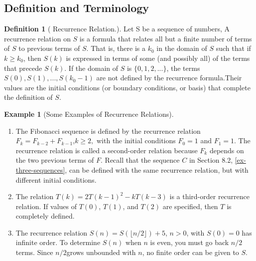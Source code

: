 \documentclass[10pt,]{book}
\theoremstyle{plain}
\theoremstyle{definition}
\newtheorem{definition}[theorem]{Definition}
\theoremstyle{definition}
\theoremstyle{definition}
\newtheorem{example}[theorem]{Example}
\theoremstyle{definition}
\numberwithin{equation}{section}
\begin{document}
\subsection[Definition and Terminology]{Definition and Terminology}\label{defs-rr}
\begin{definition}[ Recurrence Relation.]\label{def-recurrence-relation}
Let S be a sequence of numbers, A recurrence relation on \(S\) is a formula that relates all but a finite number of terms of \(S\) to previous terms of \(S\). That is, there is a \(k_0\) in the domain of \(S\) such that if \(k \geq  k_0\), then \(S(k)\)
is expressed in terms of some (and possibly all) of the terms that precede \(S(k)\). If the domain of \(S\) is \(\{0,1,2,\textrm{...}\}\), the terms \(S
(0), S(1), . . . , S\left(k_0-1\right)\) are not defined by the recurrence formula.Their values are the initial conditions (or boundary conditions,
or basis) that complete the definition of \(S\).%
\end{definition}
\begin{example}[Some Examples of Recurrence Relations]\label{ex-some-recurrence-relations}
\leavevmode%
\begin{enumerate}[label=\alph*]
\item\hypertarget{li-26}{} The Fibonacci sequence is defined by the recurrence relation \(F_k= F_{k-2}+ F_{k-1}\),\(k\geq 2,\) with the initial conditions \(F_0=1\) and \(F_1=1\). The recurrence relation is called a second-order relation because \(F_k\) depends on the two previous terms of
\(F\). Recall that the sequence \(C\) in Section 8.2, \hyperref[ex-three-sequences]{\ref{ex-three-sequences}}, can be defined with the same recurrence relation, but with different initial conditions.%
\item\hypertarget{li-27}{} The relation \(T(k) = 2T(k - 1)^2 - k T(k - 3)\) is a third-order recurrence relation. If values of \(T(0)\), \(T(1)\), and \(T(2)\)
are specified, then \(T\) is completely defined.%
\item\hypertarget{li-28}{} The recurrence relation \(S(n) = S(\lfloor n/2\rfloor ) + 5\), \(n > 0\), with \(S(0)=0\) has infinite order. To determine \(S(n)\) when \(n\) is even, you must go back \(n/2\) terms. Since   \(n/2\)grows unbounded with \(n\), no finite order can be given to \(S\).%
\end{enumerate}
%
\end{example}
\typeout{************************************************}
\typeout{************************************************}
\end{document}
